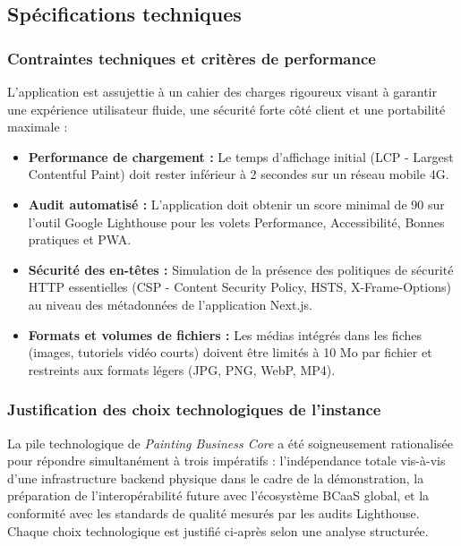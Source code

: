 \documentclass[12pt,a4paper]{report}
\begin{document}
\subsection{Spécifications techniques}

\subsubsection{Contraintes techniques et critères de performance}

L'application est assujettie à un cahier des charges rigoureux visant à garantir une expérience utilisateur fluide, une sécurité forte côté client et une portabilité maximale :

\begin{itemize}
    \item \textbf{Performance de chargement :} Le temps d'affichage initial (LCP - Largest Contentful Paint) doit rester inférieur à 2 secondes sur un réseau mobile 4G.
    \item \textbf{Audit automatisé :} L'application doit obtenir un score minimal de 90 sur l'outil Google Lighthouse pour les volets Performance, Accessibilité, Bonnes pratiques et PWA.
    \item \textbf{Sécurité des en-têtes :} Simulation de la présence des politiques de sécurité HTTP essentielles (CSP - Content Security Policy, HSTS, X-Frame-Options) au niveau des métadonnées de l'application Next.js.
    \item \textbf{Formats et volumes de fichiers :} Les médias intégrés dans les fiches (images, tutoriels vidéo courts) doivent être limités à 10 Mo par fichier et restreints aux formats légers (JPG, PNG, WebP, MP4).
\end{itemize}

\subsubsection{Justification des choix technologiques de l'instance}

\noindent
La pile technologique de \textit{Painting Business Core} a été soigneusement rationalisée pour répondre simultanément à trois impératifs : l'indépendance totale vis-à-vis d'une infrastructure backend physique dans le cadre de la démonstration, la préparation de l'interopérabilité future avec l'écosystème BCaaS global, et la conformité avec les standards de qualité mesurés par les audits Lighthouse. Chaque choix technologique est justifié ci-après selon une analyse structurée.
\end{document}
